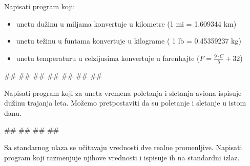 \begin{Exercise}[label=p1_10] 
Napisati program koji:
\begin{itemize}
\item unetu dužinu u miljama konvertuje u kilometre (1 mi = 1.609344 km)
\item unetu težinu u funtama konvertuje u kilograme ( 1 lb = 0.45359237 kg)
\item unetu temperaturu u celzijusima konvertuje u farenhajte ($F=\frac{9\cdot C}{5}+32$)
\end{itemize}

\begin{maxitest}
\begin{upotreba}{1}
#\naslovInt#
##
##
##
##
##
##
\end{upotreba}
\end{maxitest}
\end{Exercise}
\begin{Answer}[ref=p1_10]
\end{Answer}

\begin{Exercise}[label=p1_11] 
Napisati program koji za uneta vremena poletanja i sletanja aviona  ispisuje dužinu trajanja leta. Možemo pretpostaviti da su poletanje i sletanje u istom danu.\\
\begin{miditest}
\begin{upotreba}{1}
#\naslovInt#
##
##
##
\end{upotreba}
\end{miditest}
\end{Exercise}
\begin{Answer}[ref=p1_11]
\end{Answer}


\begin{Exercise}[label=p1_12]
Sa standarnog ulaza se učitavaju vrednosti dve realne promenljive. Napisati program koji razmenjuje njihove vrednosti i ispisuje ih na standardni izlaz. \\
\end{Exercise}
\begin{Answer}[ref=p1_12]
\end{Answer}


